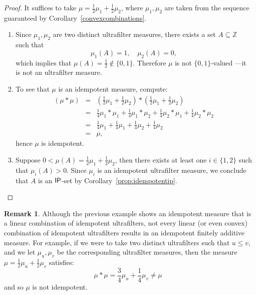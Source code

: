 \documentclass{jloganal}
\theoremstyle{definition}
\newtheorem*{rem}{Remark}             %
\newcommand{\ip}{\mathnormal{\mathsf{IP}}}
\begin{document}
\begin{proof}
It suffices to take $\mu=\frac{1}{2}\mu_1+\frac{1}{2}\mu_2$, where $\mu_1,\mu_2$ are taken from the sequence guaranteed by Corollary~\ref{convexcombinations}.
    \begin{enumerate}
        \item Since $\mu_1,\mu_2$ are two distinct ultrafilter measures, there exists a set $A\subseteq\mathbb Z$ such that
\[
\mu_{1}(A)=1, \quad \mu_2(A)=0,
\]
which implies that $\mu(A)=\frac{1}{2}\notin\{0,1\}$. Therefore $\mu$ is not $\{0,1\}$-valued ---it is not an ultrafilter measure.

\item To see that $\mu$ is an idempotent measure, compute:
\begin{eqnarray*}
    (\mu*\mu)& = & \left(\frac{1}{2}\mu_1+\frac{1}{2}\mu_2\right)*\left(\frac{1}{2}\mu_1+\frac{1}{2}\mu_2\right)\\
    &=& \frac{1}{4}\mu_1*\mu_1+\frac{1}{4}\mu_1*\mu_2+\frac{1}{4}\mu_2*\mu_1+\frac{1}{4}\mu_2*\mu_2\\
&=& \frac{1}{4}\mu_1+\frac{1}{4}\mu_1+\frac{1}{4}\mu_2+\frac{1}{4}\mu_2\\
& = & \mu,
\end{eqnarray*}
hence $ \mu $ is idempotent.\\

\item Suppose $0<\mu(A)=\frac{1}{2}\mu_{1}+\frac{1}{2}\mu_2$, then there exists at least one $i\in\{1,2\}$ such that $\mu_i(A)>0$. Since $\mu_i$ is an idempotent ultrafilter measure, we conclude that $A$ is an $\ip$-set by Corollary~\ref{prop:idempotentip}.
    \end{enumerate}
\end{proof}

\begin{rem}
    Although the previous example shows an idempotent measure that is a linear combination of idempotent ultrafilters, not every linear (or even convex) combination of idempotent ultrafilters results in an idempotent finitely additive measure. For example, if we were to take two distinct ultrafilters such that $u\leq v$, and we let $\mu_u,\mu_v$ be the corresponding ultrafilter measures, then the measure $\mu=\frac{1}{2}\mu_u+\frac{1}{2}\mu_v$ satisfies:
    \begin{equation*}
        \mu*\mu=\frac{3}{4}\mu_u+\frac{1}{4}\mu_v\neq\mu
    \end{equation*}
    and so $\mu$ is not idempotent.
\end{rem}
\end{document}
